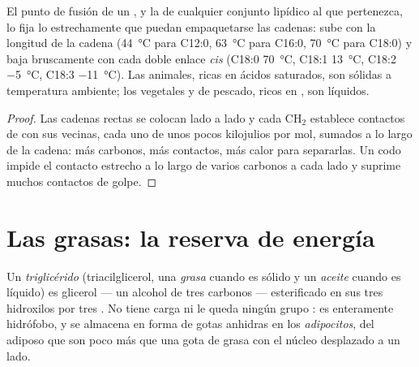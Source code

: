 \begin{proposition}\label{prop:b1:lipids:melting}
El punto de fusión de un , y la  de cualquier conjunto
lipídico al que pertenezca, lo fija lo estrechamente que puedan empaquetarse
las cadenas: sube con la longitud de la cadena (\qty{44}{\celsius} para
C12:0, \qty{63}{\celsius} para C16:0, \qty{70}{\celsius} para C18:0) y baja
bruscamente con cada doble enlace \emph{cis} (C18:0 \qty{70}{\celsius},
C18:1 \qty{13}{\celsius}, C18:2 \qty{-5}{\celsius}, C18:3
\qty{-11}{\celsius}). Las  animales, ricas en ácidos saturados, son
sólidas a temperatura ambiente; los  vegetales y de pescado, ricos en
, son líquidos.
\end{proposition}
\begin{proof}
Las cadenas rectas se colocan lado a lado y cada $\mathrm{CH_2}$ establece
contactos de  con sus vecinas, cada uno de unos pocos
kilojulios por mol, sumados a lo largo de la cadena: más carbonos, más
contactos, más calor para separarlas. Un codo impide el contacto estrecho a
lo largo de varios carbonos a cada lado y suprime muchos contactos de golpe.
\end{proof}

\section{Las grasas: la reserva de energía}

\begin{definition}[Triglicérido]\label{def:b1:lipids:triglyceride}
Un \emph{triglicérido} (triacilglicerol, una
\emph{grasa} cuando es sólido y un \emph{aceite}
cuando es líquido) es glicerol --- un alcohol de tres carbonos ---
esterificado en sus tres hidroxilos por tres . No tiene carga
ni le queda ningún grupo : es enteramente hidrófobo, y se almacena en
forma de gotas anhidras en los \emph{adipocitos}, 
del  adiposo que son poco más que una gota de grasa con el núcleo
desplazado a un lado.
\end{definition}

